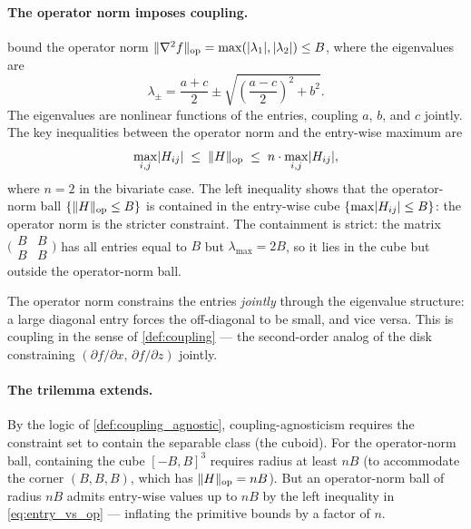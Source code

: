 \paragraph{The operator norm imposes coupling.}
\textcite{imbens_optimized_2019} bound the operator norm $\lVert\nabla^2 f\rVert_{\mathrm{op}} = \max(\lvert\lambda_1\rvert, \lvert\lambda_2\rvert) \leq B$, where the eigenvalues are
\begin{equation*}
	\lambda_{\pm} = \frac{a + c}{2} \pm \sqrt{\left(\frac{a-c}{2}\right)^2 + b^2}.
\end{equation*}
The eigenvalues are nonlinear functions of the entries, coupling $a$, $b$, and $c$ jointly.
The key inequalities between the operator norm and the entry-wise maximum are
\begin{equation}\label{eq:entry_vs_op}
	\max_{i,j} \lvert H_{ij}\rvert \;\leq\; \lVert H\rVert_{\mathrm{op}} \;\leq\; n \cdot \max_{i,j} \lvert H_{ij}\rvert,
\end{equation}
where $n = 2$ in the bivariate case.
The left inequality shows that the operator-norm ball $\{\lVert H\rVert_{\mathrm{op}} \leq B\}$ is contained in the entry-wise cube $\{\max \lvert H_{ij}\rvert \leq B\}$: the operator norm is the stricter constraint.
The containment is strict: the matrix $\bigl(\begin{smallmatrix} B & B \\ B & B \end{smallmatrix}\bigr)$ has all entries equal to $B$ but $\lambda_{\max} = 2B$, so it lies in the cube but outside the operator-norm ball.

The operator norm constrains the entries \emph{jointly} through the eigenvalue structure: a large diagonal entry forces the off-diagonal to be small, and vice versa.
This is coupling in the sense of \cref{def:coupling} --- the second-order analog of the disk constraining $(\partial f / \partial x,\, \partial f / \partial z)$ jointly.

\paragraph{The trilemma extends.}
By the logic of \cref{def:coupling_agnostic}, coupling-agnosticism requires the constraint set to contain the separable class (the cuboid).
For the operator-norm ball, containing the cube $[-B, B]^3$ requires radius at least $nB$ (to accommodate the corner $(B, B, B)$, which has $\lVert H\rVert_{\mathrm{op}} = nB$).
But an operator-norm ball of radius $nB$ admits entry-wise values up to $nB$ by the left inequality in \eqref{eq:entry_vs_op} --- inflating the primitive bounds by a factor of $n$.

